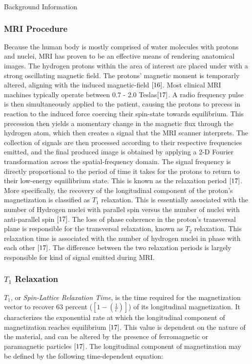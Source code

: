 \documentclass[a4paper,12pt]{article}
\begin{document}
\begin{section}{Background Information}
\subsubsection{MRI Procedure}
Because the human body is mostly comprised of water molecules with protons and nuclei, MRI has proven to be an effective means of rendering anatomical images. The hydrogen protons within the area of interest are placed under with a strong oscillating magnetic field. The protons' magnetic moment is temporarly altered, aligning with the induced magnetic-field $\cite{16}$. 
Most clinical MRI machines typically operate between 0.7 - 2.0 Teslas$\cite{17}$. 
A radio frequency pulse is then simultaneously applied to the patient, causing the protons to precess in reaction to the induced force coercing their spin-state towards equilibrium. 
This precession then yields a momentary change in the magnetic flux through the hydrogen atom, which then creates a signal that the MRI scanner interprets. The collection of signals are then processed according to their respective frequencies emitted, and the final produced image is obtained by applying a 2-D Fourier transformation across the spatial-frequency domain. 
The signal frequency is directly proportional to the period of time it takes for the protons to return to their low-energy equiilibrium state. This is known as the relaxation period $\cite{17}$. 
More specifically, the recovery of the longitudinal component of the proton's magnetization is classified as $T_1$ relaxation. This is essentially associated with the number of Hydrogen nuclei with parallel spin versus the number of nuclei with anti-parallel spin $\cite{17}$. 
The loss of phase coherence in the proton's transversal plane is responsible for the transversal relaxation, known as $T_2$ relaxation. This relaxation time is associated with the number of hydrogen nuclei in phase with each other $\cite{17}$. 
The difference between the two relaxation periods is largely responsible for kind of signal emitted during MRI.

\subsubsection{$T_1$ Relaxation}
$T_1$, or {\em Spin-Lattice Relaxation Time}, is the time required for the magnetization vector to recover 63 percent ($[1-(\frac{1}{e})]$) of its longitudinal magnetization. It characterizes the exponential rate at which the longitudinal component of magnetization reaches equilibrium $\cite{17}$. This value is dependent on the nature of the material, and can be altered by the presence of ferromagnetic or paramagnetic particles $\cite{17}$. The longitudinal component of magnetization may be defined by the following time-dependent equation:


\end{section}
\end{document}
